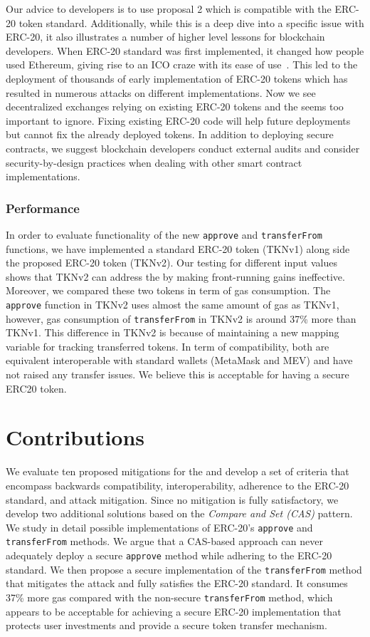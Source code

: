 Our advice to developers is to use proposal 2 which is compatible with the ERC-20 token standard. Additionally, while this is a deep dive into a specific issue with ERC-20, it also illustrates a number of higher level lessons for blockchain developers. When ERC-20 standard was first implemented, it changed how people used Ethereum, giving rise to an ICO craze with its ease of use~\cite{fenu2018ico}. This led to the deployment of thousands of early implementation of ERC-20 tokens which has resulted in numerous attacks on different implementations. Now we see decentralized exchanges relying on existing ERC-20 tokens and the \mwa seems too important to ignore. Fixing existing ERC-20 code will help future deployments but cannot fix the already deployed tokens. In addition to deploying secure contracts, we suggest blockchain developers conduct external audits and consider security-by-design practices when dealing with other smart contract implementations.

\subsubsection{Performance} In order to evaluate functionality of the new \texttt{approve} and \texttt{transferFrom} functions, we have implemented a standard ERC-20 token (TKNv1) along side the proposed ERC-20 token (TKNv2). Our testing for different input values shows that TKNv2 can address the \mwa by making front-running gains ineffective. Moreover, we compared these two tokens in term of gas consumption. The \texttt{approve} function in TKNv2 uses almost the same amount of gas as TKNv1, however, gas consumption of \texttt{transferFrom} in TKNv2 is around 37\% more than TKNv1. This difference in TKNv2 is because of maintaining a new mapping variable for tracking transferred tokens. In term of compatibility, both are equivalent interoperable with standard wallets (\eg MetaMask and MEV) and have not raised any transfer issues. We believe this is acceptable for having a secure ERC20 token.

\section{Contributions}
We evaluate ten proposed mitigations for the \mwa and develop a set of criteria that encompass backwards compatibility, interoperability, adherence to the ERC-20 standard, and attack mitigation. Since no mitigation is fully satisfactory, we develop two additional solutions based on the \textit{Compare and Set (CAS)} pattern. We study in detail possible implementations of ERC-20's \texttt{approve} and \texttt{transferFrom} methods. We argue that a CAS-based approach can never adequately deploy a secure \texttt{approve} method while adhering to the ERC-20 standard. We then propose a secure implementation of the \texttt{transferFrom} method that mitigates the attack and fully satisfies the ERC-20 standard. It consumes 37\% more gas compared with the non-secure \texttt{transferFrom} method, which appears to be acceptable for achieving a secure ERC-20 implementation that protects user investments and provide a secure token transfer mechanism.

